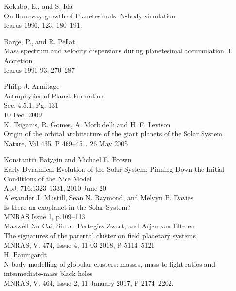 \documentclass[a4paper,10pt]{article}
\begin{document}
\begin{thebibliography}{9}

Kokubo, E., and S. Ida\\
On Runaway growth of Planetesimals: N-body simulation\\ 
Icarus 1996, 123, 180--191.

Barge, P., and R. Pellat\\ 
Mass spectrum and velocity dispersions during planetesimal accumulation. I. Accretion\\
Icarus 1991 93, 270--287

Philip J. Armitage\\
Astrophysics of Planet Formation\\
Sec. 4.5.1, Pg. 131\\
10 Dec. 2009\\

K. Tsiganis, R. Gomes, A. Morbidelli and H. F. Levison\\
Origin of the orbital architecture of the giant planets of the Solar System\\ 
Nature, Vol 435, P 469--451, 26 May 2005

Konstantin Batygin and Michael E. Brown\\
Early Dynamical Evolution of the Solar System: Pinning Down the Initial Conditions of the Nice Model\\
 ApJ, 716:1323--1331, 2010 June 20\\

Alexander J. Mustill, Sean N. Raymond, and Melvyn B. Davies\\
Is there an exoplanet in the Solar System?\\
MNRAS Issue 1, p.109--113\\

Maxwell Xu Cai, Simon Portegies Zwart, and Arjen van Elteren\\ 
The signatures of the parental cluster on field planetary systems\\
MNRAS, V. 474, Issue 4, 11 03 2018, P 5114--5121\\

H. Baumgardt\\
N-body modelling of globular clusters: masses, mass-to-light ratios and intermediate-mass black holes\\
MNRAS, V. 464, Issue 2, 11 January 2017, P 2174--2202.


\end{thebibliography}
\end{document}
